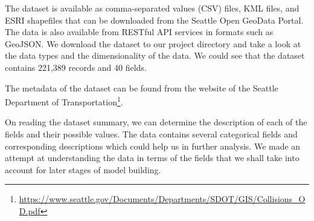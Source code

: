 \documentclass{article}
\begin{document}
The dataset is available as comma-separated values (CSV) files, KML files, and ESRI shapefiles that can be downloaded from the Seattle Open GeoData Portal. The data is also available from RESTful API services in formats such as GeoJSON. We download the dataset to our project directory and take a look at the data types and the dimensionality of the data. We could see that the dataset contains 221,389 records and 40 fields.

The metadata of the dataset can be found from the website of the Seattle Department of Transportation\footnote[2]{\href{https://www.seattle.gov/Documents/Departments/SDOT/GIS/Collisions\_OD.pdf}{https://www.seattle.gov/Documents/Departments/SDOT/GIS/Collisions\_OD.pdf}}.

On reading the dataset summary, we can determine the description of each of the fields and their possible values. The data contains several categorical fields and corresponding descriptions which could help us in further analysis. We made an attempt at understanding the data in terms of the fields that we shall take into account for later stages of model building.
\end{document}
